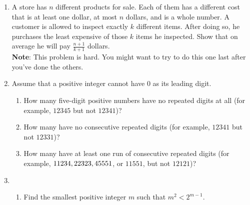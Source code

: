 \documentclass[11pt]{article}
\begin{document}
\begin{enumerate}




\item A store has $n$ different products for sale.  Each of them has a different cost that is at least one dollar, at most $n$ dollars, and is a whole number.  A customer is allowed to inspect exactly $k$ different items.  After doing so, he purchases the least expensive of those $k$ items he inspected.  Show that on average he will pay $\frac{n+1}{k+1}$ dollars.\\

{\bf Note}: This problem is hard.  You might want to try to do this one last after you've done the others.

\item Assume that a positive integer cannot have $0$ as its leading digit.
\begin{enumerate}
\item How many five-digit positive numbers have no repeated digits at all (for example, $12345$ but not $12341$)?




\item How many have no consecutive repeated digits (for example, $12341$ but not $12331$)?

\item How many have at least one run of consecutive repeated digits (for example, $11234, 22323, \\ 45551$, or $11551$, but not $12121$)?
\end{enumerate}

\item 
\begin{enumerate}
\item Find the smallest positive integer $m$ such that $m^2 < 2^{m-1}$.


\end{enumerate}
\end{enumerate}
\end{document}
